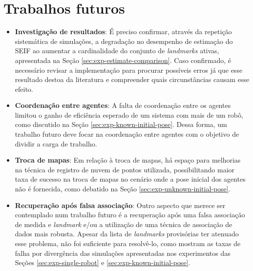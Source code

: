 \section{Trabalhos futuros}
\begin{itemize}
  \item \textbf{Investigação de resultados}: É preciso confirmar, através da 
  repetição sistemática de simulações, a degradação no desempenho de estimação do SEIF ao aumentar a cardinalidade do conjunto de \textit{landmarks} ativas, apresentada na Seção \ref{sec:exp-estimate-comparison}. Caso confirmado, é necessário revisar a 
  implementação para procurar possíveis erros já que esse resultado 
  destoa da literatura e compreender quais circunstâncias causam esse efeito.
  \item \textbf{Coordenação entre agentes}: A falta de 
coordenação entre os agentes limitou o ganho de eficiência esperado de 
um sistema com mais de um robô, como discutido na Seção \ref{sec:exp-known-initial-pose}. Dessa forma, um trabalho futuro deve focar na coordenação entre agentes com o objetivo de dividir a carga de trabalho.
  \item \textbf{Troca de mapas}: Em relação à troca de mapas, há espaço para melhorias na técnica de registro de nuvem de pontos utilizada, possibilitando maior taxa de sucesso na troca de mapas 
no cenário onde a pose inicial dos agentes não é fornecida, como debatido na Seção \ref{sec:exp-unknown-initial-pose}. 
  \item \textbf{Recuperação após falsa associação}: Outro aspecto que merece ser contemplado num trabalho futuro é a recuperação após uma falsa associação de medida e \textit{landmark} e/ou a 
utilização de uma técnica de associação de dados mais robusta. Apesar da 
lista de \textit{landmarks} provisórias ter atenuado esse problema, não foi 
suficiente para resolvê-lo, como mostram as taxas de falha por divergência das 
simulações apresentadas nos experimentos das Seções \ref{sec:exp-single-robot}  e \ref{sec:exp-known-initial-pose}.
\end{itemize}




